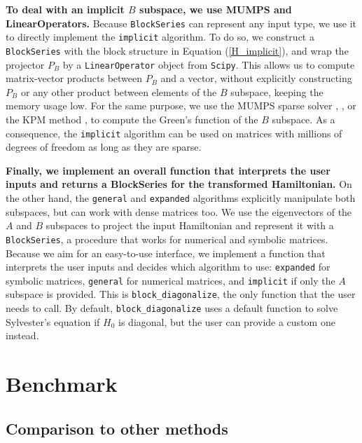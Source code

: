 \documentclass[submission, Codebases]{SciPost}
\begin{document}
{{\textbf{To deal with an implicit $B$ subspace, we use MUMPS and LinearOperators.}
Because \texttt{BlockSeries} can represent any input type, we use it to directly
implement the \texttt{implicit} algorithm.
To do so, we construct a \texttt{BlockSeries} with the block structure in Equation
(\ref{H_implicit}), and wrap the projector $P_B$ by a \texttt{LinearOperator} object
from \texttt{Scipy}.
This allows us to compute matrix-vector products between $P_B$ and a vector,
without explicitly constructing $P_B$ or any other product between elements of
the $B$ subspace, keeping the memory usage low.
For the same purpose, we use the MUMPS sparse solver
\cite{Amestoy_2001},
\cite{Amestoy_2006}, or the KPM method
\cite{Wei_e_2006}, to compute the Green's function of the
$B$ subspace.
As a consequence, the \texttt{implicit} algorithm can be used on matrices with
millions of degrees of freedom as long as they are sparse.

\textbf{Finally, we implement an overall function that interprets the user inputs and
returns a BlockSeries for the transformed Hamiltonian.}
On the other hand, the \texttt{general} and \texttt{expanded} algorithms explicitly
manipulate both subspaces, but can work with dense matrices too.
We use the eigenvectors of the $A$ and $B$ subspaces to project the input
Hamiltonian and represent it with a \texttt{BlockSeries}, a procedure that works for
numerical and symbolic matrices.
Because we aim for an easy-to-use interface, we implement a function that
interprets the user inputs and decides which algorithm to use: \texttt{expanded}
for symbolic matrices, \texttt{general} for numerical matrices, and \texttt{implicit} if
only the $A$ subspace is provided.
This is \texttt{block\_diagonalize}, the only function that the user needs to call.
By default, \texttt{block\_diagonalize} uses a default function to solve Sylvester's
equation if $H_0$ is diagonal, but the user can provide a custom one instead.

\section{Benchmark}

\subsection{Comparison to other methods}

}}
\end{document}
